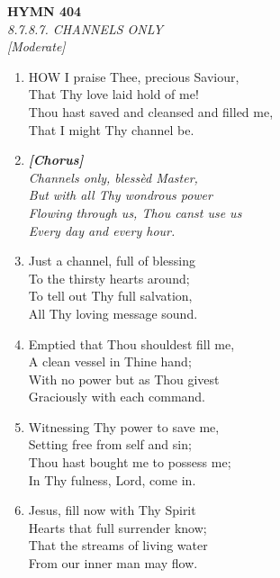\newpage
\begin{center}
    {\Large \textbf{HYMN 404}}
    \\
    \textit{8.7.8.7. CHANNELS ONLY}
    \\
    \textit{\small [Moderate]}
\end{center}
\vspace{1em}

\begin{enumerate}
    \item HOW I praise Thee, precious Saviour, \\
        That Thy love laid hold of me! \\
        Thou hast saved and cleansed and filled me, \\
        That I might Thy channel be.

    \item[] \vspace{0.4em}
    \textbf{\textit{[Chorus]}} \\
    \textit{Channels only, bless\`ed Master,} \\
    \textit{But with all Thy wondrous power} \\
    \textit{Flowing through us, Thou canst use us} \\
    \textit{Every day and every hour.}
    \vspace{0.4em}

    \item Just a channel, full of blessing \\
        To the thirsty hearts around; \\
        To tell out Thy full salvation, \\
        All Thy loving message sound.

    \item Emptied that Thou shouldest fill me, \\
        A clean vessel in Thine hand; \\
        With no power but as Thou givest \\
        Graciously with each command.

    \item Witnessing Thy power to save me, \\
        Setting free from self and sin; \\
        Thou hast bought me to possess me; \\
        In Thy fulness, Lord, come in.

    \item Jesus, fill now with Thy Spirit \\
        Hearts that full surrender know; \\
        That the streams of living water \\
        From our inner man may flow.

\end{enumerate}
